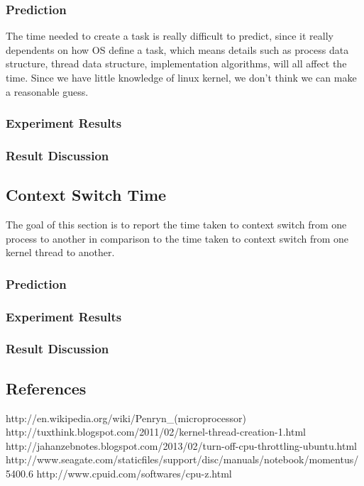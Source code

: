 \documentclass{article} %
\begin{document}
\subsubsection{Prediction}
The time needed to create a task is really difficult to predict, since it really
dependents on how OS define a task, which means details such as process
data structure, thread data structure, implementation algorithms, will all
affect the time. Since we have little knowledge of linux kernel, we don't think
we can make a reasonable guess.
\subsubsection{Experiment Results}
\subsubsection{Result Discussion}

\subsection{Context Switch Time}
The goal of this section is to report the time taken to context switch from one process to another in comparison to the time taken to context switch from one kernel thread to another. 
\subsubsection{Prediction}
\subsubsection{Experiment Results}
\subsubsection{Result Discussion}


\subsection{References}
http://en.wikipedia.org/wiki/Penryn_(microprocessor)\\
http://tuxthink.blogspot.com/2011/02/kernel-thread-creation-1.html
http://jahanzebnotes.blogspot.com/2013/02/turn-off-cpu-throttling-ubuntu.html
http://www.seagate.com/staticfiles/support/disc/manuals/notebook/momentus/5400.6%
http://www.cpuid.com/softwares/cpu-z.html
\end{document}

